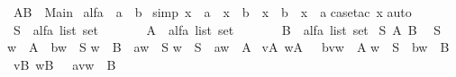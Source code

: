 %
\begin{isabellebody}%
\def\isabellecontext{AB}%
\ AB\ {\isacharequal}\ Main{\isacharcolon}\isanewline
\isanewline
{}\ alfa\ {\isacharequal}\ a\ {\isacharbar}\ b\isanewline
\isanewline
{}\ {\isacharbrackleft}simp{\isacharbrackright}{\isacharcolon}\ {\isachardoublequote}{\isacharparenleft}x\ {\isachartilde}{\isacharequal}\ a{\isacharparenright}\ {\isacharequal}\ {\isacharparenleft}x\ {\isacharequal}\ b{\isacharparenright}\ {\isacharampersand}\ {\isacharparenleft}x\ {\isachartilde}{\isacharequal}\ b{\isacharparenright}\ {\isacharequal}\ {\isacharparenleft}x\ {\isacharequal}\ a{\isacharparenright}{\isachardoublequote}\isanewline
{}case{\isacharunderscore}tac\ x{\isacharparenright}\isanewline
{}auto{\isacharparenright}\isanewline
\isanewline
{}\ S\ {\isacharcolon}{\isacharcolon}\ {\isachardoublequote}alfa\ list\ set{\isachardoublequote}\isanewline
\ \ \ \ \ \ \ A\ {\isacharcolon}{\isacharcolon}\ {\isachardoublequote}alfa\ list\ set{\isachardoublequote}\isanewline
\ \ \ \ \ \ \ B\ {\isacharcolon}{\isacharcolon}\ {\isachardoublequote}alfa\ list\ set{\isachardoublequote}\isanewline
\isanewline
{}\ S\ A\ B\isanewline
{}\isanewline
{\isachardoublequote}{\isacharbrackleft}{\isacharbrackright}\ {\isacharcolon}\ S{\isachardoublequote}\isanewline
{\isachardoublequote}w\ {\isacharcolon}\ A\ {\isacharequal}{\isacharequal}{\isachargreater}\ b{\isacharhash}w\ {\isacharcolon}\ S{\isachardoublequote}\isanewline
{\isachardoublequote}w\ {\isacharcolon}\ B\ {\isacharequal}{\isacharequal}{\isachargreater}\ a{\isacharhash}w\ {\isacharcolon}\ S{\isachardoublequote}\isanewline
\isanewline
{\isachardoublequote}w\ {\isacharcolon}\ S\ {\isacharequal}{\isacharequal}{\isachargreater}\ a{\isacharhash}w\ {\isacharcolon}\ A{\isachardoublequote}\isanewline
{\isachardoublequote}{\isacharbrackleft}{\isacharbar}\ v{\isacharcolon}A{\isacharsemicolon}\ w{\isacharcolon}A\ {\isacharbar}{\isacharbrackright}\ {\isacharequal}{\isacharequal}{\isachargreater}\ b{\isacharhash}v{\isacharat}w\ {\isacharcolon}\ A{\isachardoublequote}\isanewline
\isanewline
{\isachardoublequote}w\ {\isacharcolon}\ S\ {\isacharequal}{\isacharequal}{\isachargreater}\ b{\isacharhash}w\ {\isacharcolon}\ B{\isachardoublequote}\isanewline
{\isachardoublequote}{\isacharbrackleft}{\isacharbar}\ v{\isacharcolon}B{\isacharsemicolon}\ w{\isacharcolon}B\ {\isacharbar}{\isacharbrackright}\ {\isacharequal}{\isacharequal}{\isachargreater}\ a{\isacharhash}v{\isacharat}w\ {\isacharcolon}\ B{\isachardoublequote}\isanewline

\end{isabellebody}

